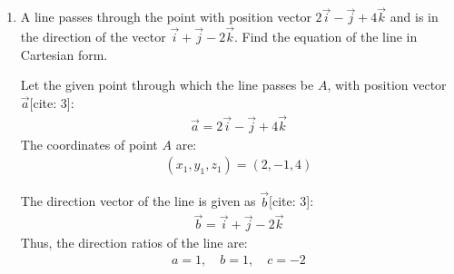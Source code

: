 \begin{enumerate}[label=\thesubsection.\arabic*, ref=\thesubsection.\theenumi]
Since the line makes equal angles with the coordinate axes[cite: 1]:
\begin{align*}
	\alpha = \beta = \gamma \implies \cos\alpha = \cos\beta = \cos\gamma
\end{align*}
which gives:
\begin{align*}
	l = m = n
\end{align*}

Using the fundamental relation between direction cosines:
\begin{align*}
	l^2 + m^2 + n^2 &= 1 \\
	l^2 + l^2 + l^2 &= 1 \\
	3l^2 &= 1 \\
	l^2 &= \frac{1}{3} \\
	l &= \pm \frac{1}{\sqrt{3}}
\end{align*}

Since $l = m = n$:
\begin{align*}
	l = \pm \frac{1}{\sqrt{3}}, \quad m = \pm \frac{1}{\sqrt{3}}, \quad n = \pm \frac{1}{\sqrt{3}}
\end{align*}

Therefore, the direction cosines of the line are:
\begin{align*}
	\left(\frac{1}{\sqrt{3}}, \frac{1}{\sqrt{3}}, \frac{1}{\sqrt{3}}\right) \quad \text{or} \quad \left(-\frac{1}{\sqrt{3}}, -\frac{1}{\sqrt{3}}, -\frac{1}{\sqrt{3}}\right)
\end{align*}




\item A line passes through the point with position vector $2\vec{i}-\vec{j}+4\vec{k}$ and is in the direction of the vector $\vec{i}+\vec{j}-2\vec{k}$. Find the equation of the line in Cartesian form.

\solution
Let the given point through which the line passes be $A$, with position vector $\vec{a}$[cite: 3]:
\begin{align*}
	\vec{a} = 2\vec{i} - \vec{j} + 4\vec{k}
\end{align*}
The coordinates of point $A$ are:
\begin{align*}
	(x_1, y_1, z_1) = (2, -1, 4)
\end{align*}

The direction vector of the line is given as $\vec{b}$[cite: 3]:
\begin{align*}
	\vec{b} = \vec{i} + \vec{j} - 2\vec{k}
\end{align*}
Thus, the direction ratios of the line are:
\begin{align*}
	a = 1, \quad b = 1, \quad c = -2
\end{align*}


\end{enumerate}
